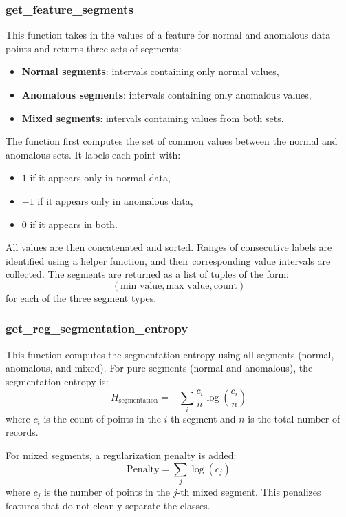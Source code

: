 \documentclass[11pt]{article}
\begin{document}
\subsubsection{get\_feature\_segments}

This function takes in the values of a feature for normal and anomalous data points and returns three sets of segments:
\begin{itemize}
  \item \textbf{Normal segments}: intervals containing only normal values,
  \item \textbf{Anomalous segments}: intervals containing only anomalous values,
  \item \textbf{Mixed segments}: intervals containing values from both sets.
\end{itemize}

The function first computes the set of common values between the normal and anomalous sets. It labels each point with:
\begin{itemize}
  \item $1$ if it appears only in normal data,
  \item $-1$ if it appears only in anomalous data,
  \item $0$ if it appears in both.
\end{itemize}

All values are then concatenated and sorted. Ranges of consecutive labels are identified using a helper function, and their corresponding value intervals are collected. The segments are returned as a list of tuples of the form:
\[
(\text{min\_value}, \text{max\_value}, \text{count})
\]
for each of the three segment types.

\subsubsection{get\_reg\_segmentation\_entropy}

This function computes the segmentation entropy using all segments (normal, anomalous, and mixed). For pure segments (normal and anomalous), the segmentation entropy is:
\[
H_{\text{segmentation}} = -\sum_i \frac{c_i}{n} \log \left( \frac{c_i}{n} \right)
\]
where \( c_i \) is the count of points in the $i$-th segment and \( n \) is the total number of records.

For mixed segments, a regularization penalty is added:
\[
\text{Penalty} = \sum_j \log(c_j)
\]
where \( c_j \) is the number of points in the $j$-th mixed segment. This penalizes features that do not cleanly separate the classes.
\end{document}
